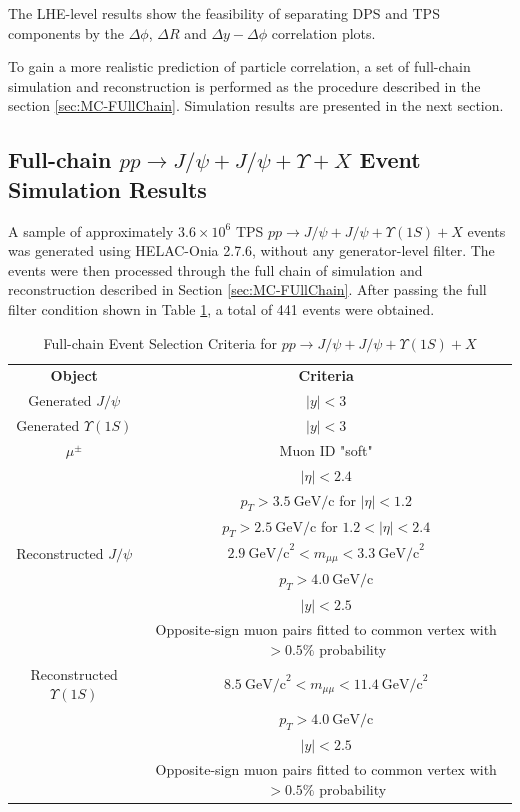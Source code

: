 \documentclass[10pt,twocolumn]{article}
\newcommand*{\GeVc}{~\text{GeV/c}}
\newcommand*{\GeVcs}{~\text{GeV/c}^2}
\begin{document}
The LHE-level results show the feasibility of separating DPS and TPS components by the $\Delta \phi$, $\Delta R$ and $\Delta y - \Delta \phi$ correlation plots.

To gain a more realistic prediction of particle correlation, a set of full-chain simulation and reconstruction is performed as the procedure described in the section \ref{sec:MC-FUllChain}. Simulation results are presented in the next section.

\subsection{Full-chain $pp\to J/\psi+J/\psi+\Upsilon+X$ Event Simulation Results}

A sample of approximately $3.6\times 10^6$ TPS $pp\to J/\psi+J/\psi+\Upsilon(1S)+X$ events was generated using HELAC-Onia 2.7.6, without any generator-level filter. The events were then processed through the full chain of simulation and reconstruction described in Section \ref{sec:MC-FUllChain}. After passing the full filter condition shown in Table \ref{tab:JpsiJpsiY_MC_Full_Filter}, a total of 441 events were obtained.

\begin{table}[]
    \centering
    \caption{Full-chain Event Selection Criteria for $pp\to J/\psi+J/\psi+\Upsilon(1S)+X$\\}
    \begin{tabular}{cc}
        \textbf{Object} & \textbf{Criteria} \\
        Generated $J/\psi $         & $\left|y\right|<3$ \\
        Generated $\Upsilon(1S)$    & $\left|y\right|<3$ \\
        \midrule
        $\mu^\pm $ & Muon ID "soft" \\
                & $|\eta| < 2.4$ \\
                & $p_T > 3.5\GeVc$ for $|\eta| < 1.2$ \\
                & $p_T > 2.5\GeVc$ for $1.2 < |\eta| < 2.4$ \\
        \midrule
        Reconstructed $J/\psi$ & $2.9 \GeVcs < m_{\mu\mu} < 3.3 \GeVcs$ \\
                & $p_T > 4.0\GeVc$ \\
                & $|y| < 2.5$ \\
                & Opposite-sign muon pairs fitted to common vertex with $> 0.5\%$ probability \\
        \midrule
        Reconstructed $\Upsilon(1S)$ & $8.5\GeVcs < m_{\mu\mu} < 11.4 \GeVcs$ \\
                & $p_T > 4.0\GeVc$ \\
                & $|y| < 2.5$ \\
                & Opposite-sign muon pairs fitted to common vertex with $> 0.5\%$ probability \\
        \midrule
    \end{tabular}
    \label{tab:JpsiJpsiY_MC_Full_Filter}
\end{table}
\end{document}
